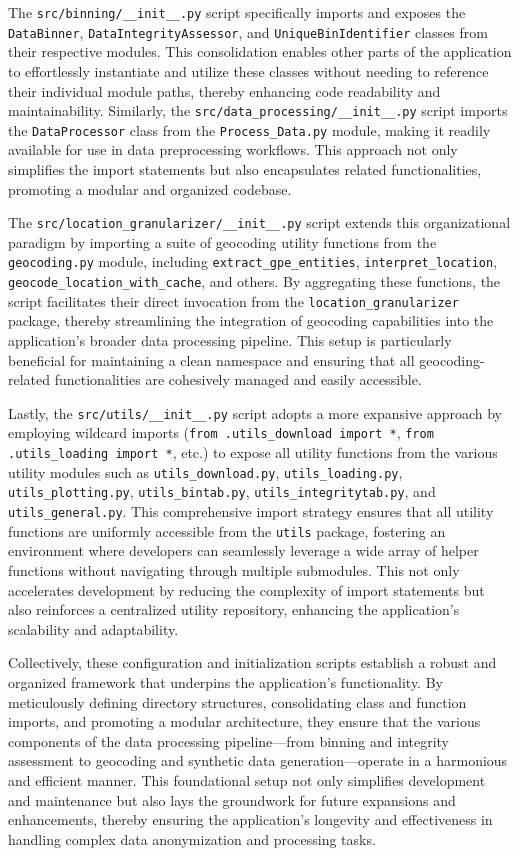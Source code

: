 \documentclass{article}
\begin{document}
The \texttt{src/binning/\_\_init\_\_.py} script specifically imports and exposes the \texttt{DataBinner}, \texttt{DataIntegrityAssessor}, and \texttt{UniqueBinIdentifier} classes from their respective modules. This consolidation enables other parts of the application to effortlessly instantiate and utilize these classes without needing to reference their individual module paths, thereby enhancing code readability and maintainability. Similarly, the \texttt{src/data\_processing/\_\_init\_\_.py} script imports the \texttt{DataProcessor} class from the \texttt{Process\_Data.py} module, making it readily available for use in data preprocessing workflows. This approach not only simplifies the import statements but also encapsulates related functionalities, promoting a modular and organized codebase.

The \texttt{src/location\_granularizer/\_\_init\_\_.py} script extends this organizational paradigm by importing a suite of geocoding utility functions from the \texttt{geocoding.py} module, including \texttt{extract\_gpe\_entities}, \texttt{interpret\_location}, \texttt{geocode\_location\_with\_cache}, and others. By aggregating these functions, the script facilitates their direct invocation from the \texttt{location\_granularizer} package, thereby streamlining the integration of geocoding capabilities into the application's broader data processing pipeline. This setup is particularly beneficial for maintaining a clean namespace and ensuring that all geocoding-related functionalities are cohesively managed and easily accessible.

Lastly, the \texttt{src/utils/\_\_init\_\_.py} script adopts a more expansive approach by employing wildcard imports (\texttt{from .utils\_download import *}, \texttt{from .utils\_loading import *}, etc.) to expose all utility functions from the various utility modules such as \texttt{utils\_download.py}, \texttt{utils\_loading.py}, \texttt{utils\_plotting.py}, \texttt{utils\_bintab.py}, \texttt{utils\_integritytab.py}, and \texttt{utils\_general.py}. This comprehensive import strategy ensures that all utility functions are uniformly accessible from the \texttt{utils} package, fostering an environment where developers can seamlessly leverage a wide array of helper functions without navigating through multiple submodules. This not only accelerates development by reducing the complexity of import statements but also reinforces a centralized utility repository, enhancing the application's scalability and adaptability.

Collectively, these configuration and initialization scripts establish a robust and organized framework that underpins the application's functionality. By meticulously defining directory structures, consolidating class and function imports, and promoting a modular architecture, they ensure that the various components of the data processing pipeline—from binning and integrity assessment to geocoding and synthetic data generation—operate in a harmonious and efficient manner. This foundational setup not only simplifies development and maintenance but also lays the groundwork for future expansions and enhancements, thereby ensuring the application's longevity and effectiveness in handling complex data anonymization and processing tasks.
\end{document}
